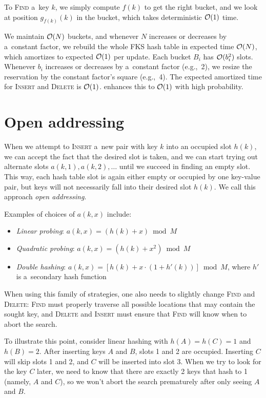 To \textsc{Find} a~key $k$, we simply compute $f(k)$ to get the right bucket,
and we look at position $g_{f(k)}(k)$ in the bucket, which takes deterministic
$\mathcal{O}(1)$ time.

We maintain $\mathcal{O}(N)$ buckets, and whenever $N$ increases or decreases by
a~constant factor, we rebuild the whole FKS hash table in expected time
$\mathcal{O}(N)$, which amortizes to expected $\mathcal{O}(1)$ per update. Each bucket $B_i$
has $\mathcal{O}(b_i^2)$ slots. Whenever $b_i$ increases or decreases by a~constant
factor (e.g.,\ 2), we resize the reservation by the constant factor's square
(e.g.,\ 4).
The expected amortized time for \textsc{Insert} and \textsc{Delete} is $\mathcal{O}(1)$.
\cite{univ-class-of-hfns} enhances this to $\mathcal{O}(1)$ with high probability.

\section{Open addressing}
\label{sec:open-addressing}
When we attempt to \textsc{Insert} a~new pair with key $k$ into an occupied slot
$h(k)$, we can accept the fact that the desired slot is taken, and we can start
trying out alternate slots $a(k,1), a(k,2), \ldots$ until we succeed in
finding an empty slot. This way, each hash table slot is again either empty or
occupied by one key-value pair, but keys will not necessarily fall into their
desired slot $h(k)$.
We call this approach \emph{open addressing}.

Examples of choices of $a(k,x)$ include:
\begin{itemize}
\item \emph{Linear probing}: $a(k,x)=(h(k)+x) \bmod M$
\item \emph{Quadratic probing}: $a(k,x)=(h(k)+x^2) \bmod M$
\item \emph{Double hashing}: $a(k,x)=[h(k)+x\cdot (1+h'(k))]\bmod M$, where
	$h'$ is a~secondary hash function
\end{itemize}

When using this family of strategies, one also needs to slightly change
\textsc{Find} and \textsc{Delete}: \textsc{Find} must properly traverse
all possible locations that may contain the sought key, and \textsc{Delete}
and \textsc{Insert} must ensure that \textsc{Find} will know when to abort
the search.

To illustrate this point, consider linear hashing with $h(A)=h(C)=1$ and
$h(B)=2$. After inserting keys $A$ and $B$, slots 1 and 2 are occupied.
Inserting $C$ will skip slots 1 and 2, and $C$ will be inserted into slot 3.
When we try to look for the key $C$ later, we need to know that there are
exactly 2 keys that hash to 1 (namely, $A$ and $C$), so we won't abort
the search prematurely after only seeing $A$ and $B$.

